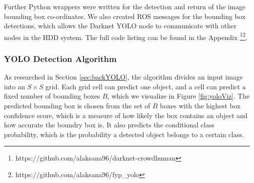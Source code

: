 Further Python wrappers were written for the detection and return of the image bounding box co-ordinates. We also created ROS messages for the bounding box detections, which allows the Darknet YOLO node to communicate with other nodes in the HDD system. The full code listing can be found in the Appendix \footnote{https://github.com/alaksana96/darknet-crowdhuman}\footnote{https://github.com/alaksana96/fyp\_yolo}.

\subsubsection{YOLO Detection Algorithm}
As researched in Section \ref{sec:backYOLO}, the algorithm divides an input image into an $S\times S$ grid. Each grid cell can predict one object, and a cell can predict a fixed number of bounding boxes $B$, which we visualize in Figure \ref{fig:yoloViz}. The predicted bounding box is chosen from the set of $B$ boxes with the highest box confidence score, which is a measure of how likely the box contains an object and how accurate the boundry box is. It also predicts the conditional class probability, which is the probability a detected object belongs to a certain class. 

